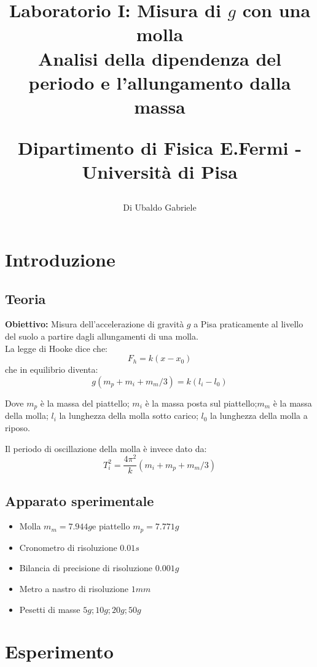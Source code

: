 \documentclass[a4paper,10pt]{article}
\title{Laboratorio I: Misura di $g$ con una molla \\ Analisi della dipendenza del periodo e l'allungamento dalla massa\\
\begin{large}
Dipartimento di Fisica E.Fermi - Università di Pisa
\end{large}}
\author{Di Ubaldo Gabriele}
\date{}
\begin{document}
\maketitle

\section{Introduzione}
\subsection{Teoria}
\textbf{Obiettivo:} Misura dell’accelerazione di gravità $g$  a Pisa praticamente al livello del suolo a partire dagli allungamenti di una molla.\\
La legge di Hooke dice che:
\begin{equation}\label{hooke}
F_h=k(x-x_0)
\end{equation}
che in equilibrio diventa:
\begin{equation}\label{ho}
g(m_p+m_i+m_m/3)=k(l_i-l_0)
\end{equation}

Dove $m_p$ è la massa del piattello; $m_i$ è la massa posta sul piattello;$m_m $ è la massa della molla; $l_i$ la lunghezza della molla sotto carico; $l_0$ la lunghezza della molla a riposo.

Il periodo di oscillazione della molla è invece dato da:
\begin{equation}\label{periodo}
T_i^2=\frac{4\pi^2}{k}(m_i+m_p+m_m/3)
\end{equation}


\subsection{Apparato sperimentale}
\begin{itemize}
\item{Molla $m_m=7.944g $e piattello $m_p=7.771g$}
\item{Cronometro di risoluzione $0.01s$}
\item{Bilancia di precisione di risoluzione $0.001g$}
\item{Metro a nastro di risoluzione $1mm$}
\item{Pesetti di masse $5g;10g;20g;50g$}
\end{itemize}



\section{Esperimento}
\end{document}
